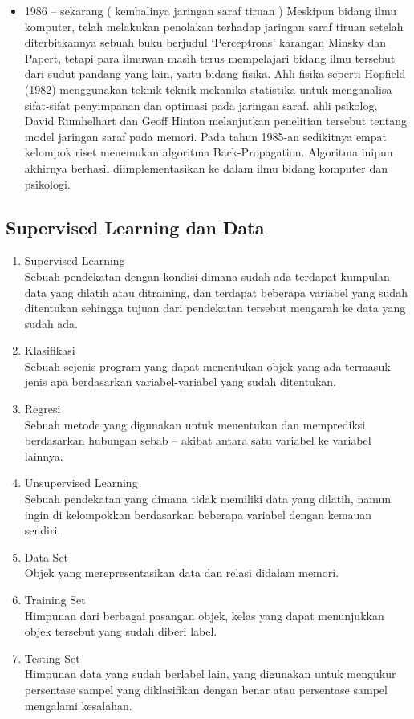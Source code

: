 \begin{enumerate}
\begin{itemize}
    \item 1986 – sekarang ( kembalinya jaringan saraf tiruan )
    Meskipun bidang ilmu komputer, telah melakukan penolakan terhadap jaringan saraf tiruan setelah diterbitkannya sebuah buku berjudul ‘Perceptrons’ karangan Minsky dan Papert, tetapi para ilmuwan masih terus mempelajari bidang ilmu tersebut dari sudut pandang yang lain, yaitu bidang fisika. Ahli fisika seperti Hopfield (1982) menggunakan teknik-teknik mekanika statistika untuk menganalisa sifat-sifat penyimpanan dan optimasi pada jaringan saraf. ahli psikolog, David Rumhelhart dan Geoff Hinton melanjutkan penelitian tersebut tentang model jaringan saraf pada memori. Pada tahun 1985-an sedikitnya empat kelompok riset menemukan algoritma Back-Propagation. Algoritma inipun akhirnya berhasil diimplementasikan ke dalam ilmu bidang komputer dan psikologi.
	\end{itemize}		
\end{enumerate}

\subsection{Supervised Learning dan Data}
\begin{enumerate}
	\item Supervised Learning\\
	Sebuah pendekatan dengan kondisi dimana sudah ada terdapat kumpulan data yang dilatih atau ditraining, dan terdapat beberapa variabel yang sudah ditentukan sehingga tujuan dari pendekatan tersebut mengarah ke data yang sudah ada.
	
	\item Klasifikasi\\
	Sebuah sejenis program yang dapat menentukan objek yang ada termasuk jenis apa berdasarkan variabel-variabel yang sudah ditentukan.
	
	\item Regresi\\
	Sebuah metode yang digunakan untuk menentukan dan memprediksi berdasarkan hubungan sebab – akibat antara satu variabel ke variabel lainnya.
	
	\item Unsupervised Learning\\
	Sebuah pendekatan yang dimana tidak memiliki data yang dilatih, namun ingin di kelompokkan berdasarkan beberapa variabel dengan kemauan sendiri.
	
	\item Data Set\\
	Objek yang merepresentasikan data dan relasi didalam memori.

	\item Training Set\\
	Himpunan dari berbagai pasangan objek, kelas yang dapat menunjukkan objek tersebut yang sudah diberi label.

	\item Testing Set\\
	Himpunan data yang sudah berlabel lain, yang digunakan untuk mengukur persentase sampel yang diklasifikan dengan benar atau persentase sampel mengalami kesalahan.

\end{enumerate}